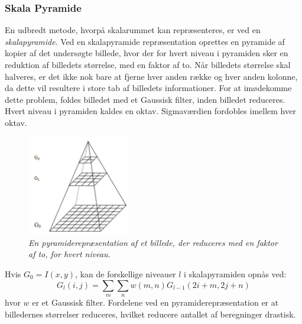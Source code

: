 \subsubsection*{Skala Pyramide}
En udbredt metode, hvorpå skalarummet kan repræsenteres, er ved en \textit{skalapyramide}. Ved en skalapyramide repræsentation oprettes en pyramide af kopier af det undersøgte billede, hvor der for hvert niveau i pyramiden sker en reduktion af billedets størrelse, med en faktor af to. 
Når billedets størrelse skal halveres, er det ikke nok bare at fjerne hver anden række og hver anden kolonne, da dette vil resultere i store tab af billedets informationer. For at imødekomme dette problem, foldes billedet med et Gaussisk filter, inden billedet reduceres.  
Hvert niveau i pyramiden kaldes en oktav. Sigmaværdien fordobles imellem hver oktav.
 \begin{figure}[H]
    \centering
    \includegraphics[width=0.40\textwidth]{fig/40.png}
     \vspace{-1em}
    \begin{center}    
       \caption{{\footnotesize \textit{En pyramiderepræsentation af et billede, der reduceres med en faktor af to, for hvert niveau. }}}
    \label{fig:scalerepdiff}
     \end{center}
     \vspace{-2.5em}
  \end{figure} \noindent
Hvis $G_0=I(x,y)$, kan de forskellige niveauer $l$ i skalapyramiden opnås ved:
\begin{equation}
G_l(i,j)=\sum\limits_{m}\sum\limits_{n}w(m,n)G_{l-1}(2i+m,2j+n)
\end{equation}
hvor $w$ er et Gaussisk filter. Fordelene ved en pyramiderepræsentation er at billedernes størrelser reduceres, hvilket reducere antallet af beregninger drastisk.